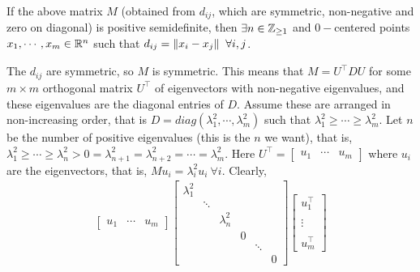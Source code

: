 \begin{enumerate}[leftmargin=*]
\begin{cl}
If the above matrix $M$ (obtained from $d_{ij}$, which are symmetric, non-negative and zero on diagonal) is positive semidefinite, then $\exists n\in\mathbb{Z}_{\ge 1}$ and $0-$centered points $x_{1},\cdots,x_{m}\in\mathbb{R}^{n}$ such that $d_{ij} = \left\lVert x_{i}-x_{j} \right\rVert_{}~\forall i,j$. 
\end{cl}
\begin{pf}
The $d_{ij}$ are symmetric, so $M$ is symmetric. This means that $M = U^{\top}DU$ for some $m\times m$ orthogonal matrix $U^{\top}$ of eigenvectors with non-negative eigenvalues, and these eigenvalues are the diagonal entries of $D$. Assume these are arranged in non-increasing order, that is $D = diag(\lambda_{1}^{2}, \cdots, \lambda_{m}^{2})$ such that $\lambda_{1}^{2}\ge \cdots \ge \lambda_{m}^{2}$. Let $n$ be the number of positive eigenvalues (this is the $n$ we want), that is, $\lambda_{1}^{2}\ge \cdots \ge \lambda_{n}^{2} > 0 = \lambda_{n+1}^{2} = \lambda_{n+2}^{2} = \cdots = \lambda_{m}^{2}$. Here $U^{\top} = \begin{bmatrix}u_{1}&\cdots&u_{m}\end{bmatrix}$ where $u_{i}$ are the eigenvectors, that is, $Mu_{i} = \lambda_{i}^{2}u_{i}~\forall i$. Clearly, \begin{align*}
\begin{bmatrix}u_{1}&\cdots&u_{m}\end{bmatrix} \begin{bmatrix}\lambda_{1}^{2}\\
&\ddots\\
&&\lambda_{n}^{2}\\
&&&0\\
&&&&\ddots\\
&&&&&0
\end{bmatrix} 
\begin{bmatrix}u_{1}^{\top}\\\\\vdots\\\\u_{m}^{\top}\end{bmatrix} 

\end{align*}
\end{pf}
\end{enumerate}
